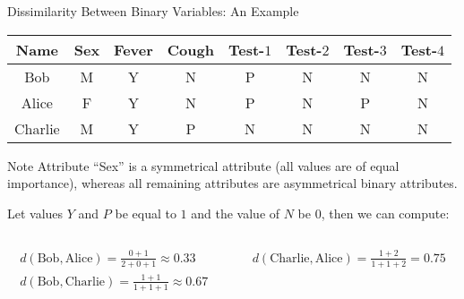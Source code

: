 \begin{frame}{Dissimilarity Between Binary Variables: An Example}
	\begin{center}
		\begin{tabular}{c | c | c | c | c | c | c | c}
			\textbf{Name} & \textbf{Sex} & \textbf{Fever} & \textbf{Cough} & \textbf{Test-$1$} & \textbf{Test-$2$} & \textbf{Test-$3$} & \textbf{Test-$4$} \\\hline
			Bob           & M            & Y              & N              & P                 & N                 & N                 & N                 \\
			Alice         & F            & Y              & N              & P                 & N                 & P                 & N                 \\
			Charlie       & M            & Y              & P              & N                 & N                 & N                 & N                 \\
		\end{tabular}
	\end{center}

	\begin{alertblock}{Note}
		Attribute ``Sex'' is a symmetrical attribute (all values are of equal importance), whereas all remaining attributes are asymmetrical binary attributes.
	\end{alertblock}

	Let values $Y$ and $P$ be equal to $1$ and the value of $N$ be $0$, then we can compute:

	\vspace*{-2em}
	\begin{columns}
		\begin{column}{0.5\textwidth}
			\begin{align*}
				d(\text{Bob}, \text{Alice}) = \frac{0+1}{2+0+1} \approx 0.33 \\
				d(\text{Bob}, \text{Charlie}) = \frac{1+1}{1+1+1} \approx 0.67
			\end{align*}
		\end{column}
		\begin{column}{0.5\textwidth}
			\begin{align*}
				d(\text{Charlie}, \text{Alice}) = \frac{1+2}{1+1+2} = 0.75
			\end{align*}
		\end{column}
	\end{columns}
\end{frame}

